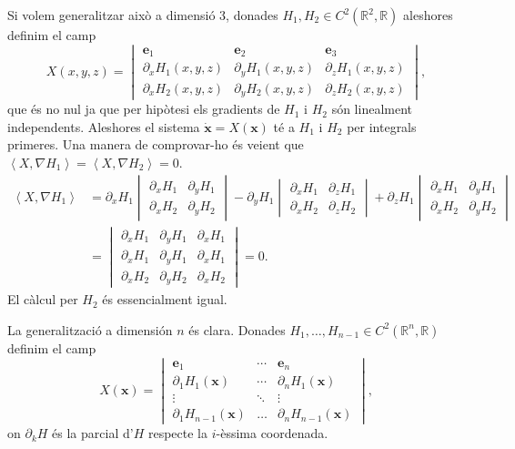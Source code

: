 \documentclass[12pt]{report}
\numberwithin{table}{section}
\numberwithin{equation}{section}
\numberwithin{figure}{section}
\renewcommand{\vec}[1]{\mathbf{#1}}
\newcommand{\R}{\mathbb{R}}
\newcommand{\inn}[2]{\left\langle #1 , #2 \right\rangle}
\begin{document}
Si volem generalitzar això a dimensió 3, donades \( H_1, H_2 \in C^2(\R^2, \R) \) aleshores definim el camp
\begin{equation*}
	X(x, y, z) = \begin{vmatrix}
		\vec{e}_1 & \vec{e}_2 & \vec{e}_3 \\
		\partial_x H_1(x,y,z) & \partial_y H_1(x,y,z) & \partial_z H_1(x,y,z) \\
		\partial_x H_2(x,y,z) & \partial_y H_2(x,y,z) & \partial_z H_2(x,y,z) 
	\end{vmatrix},
\end{equation*}
que és no nul ja que per hipòtesi els gradients de \( H_1 \) i \( H_2 \) són linealment independents. Aleshores el sistema \( \dot{\vec{x}} = X(\vec{x}) \) té a \( H_1 \) i \( H_2 \) per integrals primeres. Una manera de comprovar-ho és veient que \( \inn{X}{\nabla H_1} = \inn{X}{\nabla H_2} = 0 \).  
\begin{align*}
	\inn{X}{\nabla H_1} & = \partial_x H_1 \begin{vmatrix}
		\partial_x H_1 & \partial_y H_1 \\
		\partial_x H_2 & \partial_y H_2 
	\end{vmatrix}
- \partial_y H_1 \begin{vmatrix}
		\partial_x H_1 & \partial_z H_1 \\
		\partial_x H_2 & \partial_z H_2 
	\end{vmatrix}
+ \partial_z H_1 \begin{vmatrix}
		\partial_x H_1 & \partial_y H_1 \\
		\partial_x H_2 & \partial_y H_2 
	\end{vmatrix} \\
	& = \begin{vmatrix}
		\partial_x H_1 & \partial_y H_1 & \partial_x H_1 \\
		\partial_x H_1 & \partial_y H_1 & \partial_x H_1 \\
		\partial_x H_2 & \partial_y H_2 & \partial_x H_2 
	\end{vmatrix} = 0.
\end{align*}
El càlcul per \( H_2 \) és essencialment igual.  

La generalització a dimensión \( n \) és clara. Donades \( H_1, \dots, H_{n-1} \in C^2(\R^{n}, \R) \) definim el camp
\begin{equation} \label{eq:determinant}
	X(\vec{x}) = \begin{vmatrix}
		\vec{e}_1 & \cdots & \vec{e}_n \\
		\partial_1 H_1(\vec{x}) & \cdots & \partial_n H_1(\vec{x}) \\
		\vdots & \ddots & \vdots \\ 
		\partial_1 H_{n-1}(\vec{x}) & \dots & \partial_n H_{n-1}(\vec{x}) 
	\end{vmatrix},
\end{equation}
on \( \partial_k H \) és la parcial d'\( H \) respecte la \( i \)-èssima coordenada.
\end{document}
